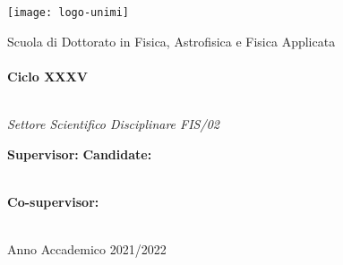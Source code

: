 

\begin{center}
	\texttt{[image: logo-unimi]}
	\vspace*{10pt}

	Scuola di Dottorato in Fisica, Astrofisica e Fisica Applicata\\
	\myDepartment\\
	\vspace*{5pt}
	\textbf{Ciclo XXXV}

	\vfill

	{\Huge \myTitle}\\
	\vspace*{30pt}
	\textit{Settore Scientifico Disciplinare FIS/02}\\

	\vfill

	\textbf{Supervisor:} \hfill \textbf{Candidate:}\\
	\myProf \hfill \myName\\
	\vspace*{5pt}
	\begin{flushleft}
		\textbf{Co-supervisor:}\\
		\myOtherProf\\
	\end{flushleft}
	\vspace*{15pt}
	Anno Accademico 2021/2022
\end{center}
	
	

\cleardoublepage
\restoregeometry
